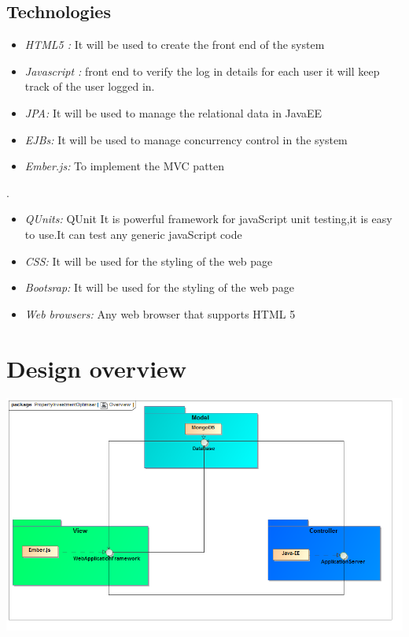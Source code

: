 \documentclass[a4paper,12pt]{article}
\begin{document}
\subsection{Technologies}

\begin{itemize}
	\item \textit{HTML5 : }It will be used to create the front end of the system
\end{itemize}
\begin{itemize}
	\item \textit{Javascript :} front end to verify the log in details for each user it will keep track of the user logged in.
\end{itemize}
\begin{itemize}
	\item \textit{JPA:} It will be used to manage the relational data in JavaEE
\end{itemize}
\begin{itemize}
	\item \textit{EJBs:} It will be used to manage concurrency control in the system
\end{itemize}
\begin{itemize}
	\item \textit{Ember.js:} To implement the MVC patten
\end{itemize}
.
\begin{itemize}
	\item \textit{QUnits:} QUnit It is powerful framework for javaScript unit testing,it is easy to use.It can test any generic javaScript code
\end{itemize}
\begin{itemize}
	\item \textit{CSS:} It will be used for the styling of the web page
\end{itemize}
\begin{itemize}
	\item \textit{Bootsrap:} It will be used for the styling of the web page 
\end{itemize}
\begin{itemize}
	\item \textit{Web browsers:} Any web browser that supports HTML 5
\end{itemize}

\newpage
\section{Design overview}
\includegraphics[width=1\textwidth]{./Image/Overview.png}
\end{document}
